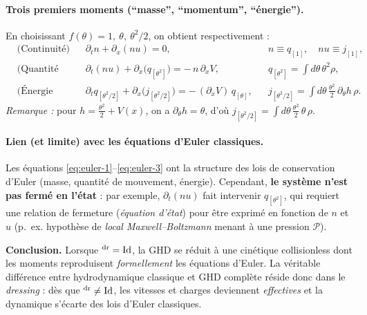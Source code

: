 \paragraph{Trois premiers moments (``masse'', ``momentum'', ``énergie'').}
En choisissant $f(\theta)=1,\ \theta,\ \theta^2/2$, on obtient respectivement :
\begin{align}
  &\text{(Continuité)}
  && \partial_t n + \partial_x (n u) = 0,
  && n \equiv q_{[1]},\quad n u \equiv j_{[1]}, \label{eq:euler-1}\\[2pt]
  &\text{(Quantité de mouvement)}
  && \partial_t (n u) + \partial_x \big( q_{[\theta^2]} \big) = -\,n\,\partial_x V,
  && q_{[\theta^2]} = \int d\theta\, \theta^2 \rho, \label{eq:euler-2}\\[2pt]
  &\text{(Énergie cinétique)}
  && \partial_t q_{[\theta^2/2]} + \partial_x \big( j_{[\theta^2/2]} \big)
     = -\,(\partial_x V)\, q_{[\theta]},
  && j_{[\theta^2/2]} = \int d\theta\, \tfrac{\theta^2}{2}\, \partial_\theta h\, \rho. \label{eq:euler-3}
\end{align}
\emph{Remarque :} pour $h=\tfrac{\theta^2}{2}+V(x)$, on a $\partial_\theta h=\theta$, d’où
$j_{[\theta^2/2]}=\int d\theta\, \tfrac{\theta^2}{2}\, \theta\, \rho$.

\paragraph{Lien (et limite) avec les équations d’Euler classiques.}
Les équations \eqref{eq:euler-1}–\eqref{eq:euler-3} ont la structure des lois de conservation d’Euler
(masse, quantité de mouvement, énergie).
Cependant, \textbf{le système n’est pas fermé en l’état} : par exemple,
$\partial_t (n u)$ fait intervenir $q_{[\theta^2]}$,
qui requiert une relation de fermeture (\emph{équation d’état}) pour être exprimé
en fonction de $n$ et $u$ (p.~ex. hypothèse de \emph{local Maxwell–Boltzmann} menant à une pression $\mathcal{P}$).

\medskip
\noindent
\textbf{Conclusion.}
Lorsque $^{\rm dr}=\mathrm{Id}$, la GHD se réduit à une cinétique collisionless
dont les moments reproduisent \emph{formellement} les équations d’Euler.
La véritable différence entre hydrodynamique classique et GHD complète réside donc dans le
\emph{dressing} : dès que $^{\rm dr}\neq \mathrm{Id}$,
les vitesses et charges deviennent \emph{effectives} et la dynamique s’écarte des lois d’Euler classiques.

